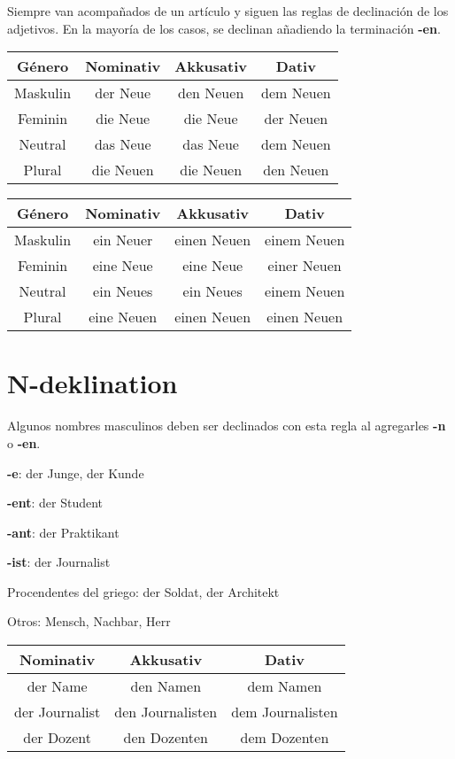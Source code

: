 Siempre van acompañados de un artículo y siguen las reglas de declinación de los adjetivos. En la mayoría de los casos, se declinan añadiendo la terminación \textbf{-en}.

\begin{tabular}{|c | c | c | c |}
\hline
\textbf{Género} & \textbf{Nominativ} & \textbf{Akkusativ} & \textbf{Dativ}\\
\hline
Maskulin & der Neue  & den Neuen & dem Neuen \\
Feminin  & die Neue  & die Neue  & der Neuen \\
Neutral  & das Neue  & das Neue  & dem Neuen \\
Plural   & die Neuen & die Neuen & den Neuen \\
\hline
\end{tabular}

\begin{tabular}{|c | c | c | c |}
\hline
\textbf{Género} & \textbf{Nominativ} & \textbf{Akkusativ} & \textbf{Dativ}\\
\hline
Maskulin & ein Neuer  &  einen Neuen & einem Neuen \\
Feminin  & eine Neue  &  eine Neue   & einer Neuen \\
Neutral  & ein Neues  &  ein Neues   & einem Neuen \\
Plural   & eine Neuen &  einen Neuen & einen Neuen \\
\hline
\end{tabular}

\section{N-deklination}

Algunos nombres masculinos deben ser declinados con esta regla al agregarles \textbf{-n} o \textbf{-en}.
\begin{myitemize}
\item \textbf{-e}: der Junge, der Kunde
\item \textbf{-ent}: der Student
\item \textbf{-ant}: der Praktikant
\item \textbf{-ist}: der Journalist
\item Procendentes del griego: der Soldat, der Architekt
\item Otros: Mensch, Nachbar, Herr
\end{myitemize}

\begin{tabular}{|c | c | c |}
\hline
\textbf{Nominativ} & \textbf{Akkusativ} & \textbf{Dativ}\\
\hline
der Name & den Namen & dem Namen \\
der Journalist & den Journalisten & dem Journalisten \\
der Dozent & den Dozenten & dem Dozenten \\
\hline
\end{tabular}

